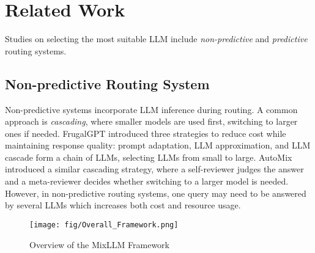 \section{Related Work}
Studies on selecting the most suitable LLM include \emph{non-predictive} and \emph{predictive} routing systems.

\subsection{Non-predictive Routing System}
Non-predictive systems incorporate LLM inference during routing. A common approach is \emph{cascading}, where smaller models are used first, switching to larger ones if needed.
FrugalGPT \cite{chen2023frugalgpt} introduced three strategies to reduce cost while maintaining response quality: prompt adaptation, LLM approximation, and LLM cascade form a chain of LLMs, selecting LLMs from small to large.  
AutoMix \cite{madaan2023automix} introduced a similar cascading strategy, where a self-reviewer judges the answer and a meta-reviewer decides whether switching to a larger model is needed.
However, in non-predictive routing systems, one query may need to be answered by several LLMs which increases both cost and resource usage.

\begin{figure*}[htbp]
\centering
\texttt{[image: fig/Overall\_Framework.png]}
\caption{Overview of the MixLLM Framework}
\label{method_overview}
\end{figure*}

